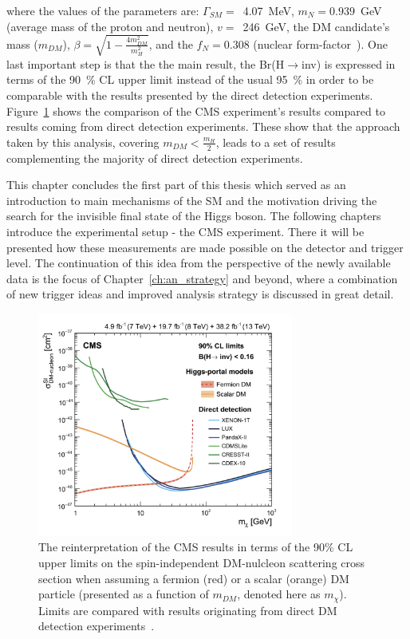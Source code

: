 where the values of the parameters are: $\Gamma_{SM} = $~4.07~MeV, $m_N = 0.939$~GeV (average mass of the proton and neutron), $v =$~246~GeV, the DM candidate's mass ($m_{DM}$), $\beta = \sqrt{1-\frac{4m_{DM}^2}{m_H^2}}$, and the $f_N=0.308$ (nuclear form-factor~\cite{paper:form_fact, paper:HIG_17_023}). One last important step is that the the main result, the Br(H$\rightarrow$inv) is expressed in terms of the 90~\% CL upper limit instead of the usual 95~\% in order to be comparable with the results presented by the direct detection experiments. Figure~\ref{fig:dm_2016} shows the comparison of the CMS experiment's results compared to results coming from direct detection experiments. These show that the approach taken by this analysis, covering $m_{DM}<\frac{m_H}{2}$, leads to a set of results complementing the majority of direct detection experiments. %

\hspace{10pt} This chapter concludes the first part of this thesis which served as an introduction to main mechanisms of the SM and the motivation driving the search for the invisible final state of the Higgs boson. The following chapters introduce the experimental setup - the CMS experiment. There it will be presented how these measurements are made possible on the detector and trigger level. The continuation of this idea from the perspective of the newly available data is the focus of Chapter~\ref{ch:an_strategy} and beyond, where a combination of new trigger ideas and improved analysis strategy is discussed in great detail.

  \begin{figure}[htbp]
    \begin{center}
        \includegraphics[width=0.75\textwidth]{Theory/DM_2016.png}
        \caption{The reinterpretation of the CMS results in terms of the 90\% CL upper limits on the spin-independent DM-nulcleon scattering cross section when assuming a fermion (red) or a scalar (orange) DM particle (presented as a function of $m_{DM}$, denoted here as $m_{\chi}$). Limits are compared with results originating from direct DM detection experiments~\cite{paper:HIG_17_023}.}
      \label{fig:dm_2016}
    \end{center}
  \end{figure}


\begin{center}
    \expandafter\pgfornament\expandafter{88}
\end{center}
\restoregeometry